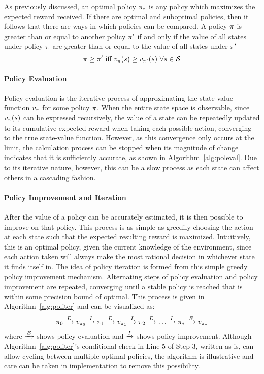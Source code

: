 As previously discussed,
an optimal policy $\pi_*$ is any policy which maximizes the expected reward
received.
%
If there are optimal and suboptimal policies,
then it follows that there are ways in which policies can be compared.
%
A policy $\pi$ is greater than or equal to another policy $\pi'$
if and only if the value of all states under policy $\pi$
are greater than or equal to the value of all states under $\pi'$
\[
\policy \ge \policy'\ 
	\text{iff}\ 
	v_\policy(s) \ge v_{\policy'}(s)\ \forall s\in\States
\]


\paragraph*{Policy Evaluation}


Policy evaluation is the iterative process of approximating the state-value
function $v_\pi$ for some policy $\pi$.
%
When the entire state space is observable,
since $v_\pi(s)$ can be expressed recursively,
the value of a state can be repeatedly updated
to its cumulative expected reward when taking each possible action,
converging to the true state-value function.
%
However,
as this convergence only occurs at the limit,
the calculation process can be stopped when its magnitude of change
indicates that it is sufficiently accurate,
as shown in Algorithm~\ref{alg:poleval}.
%
Due to its iterative nature,
however,
this can be a slow process
as each state can affect others in a cascading fashion.



\paragraph*{Policy Improvement and Iteration}



After the value of a policy can be accurately estimated,
it is then possible to improve on that policy.
% 
This process is as simple as greedily choosing the action at each state such
that the expected resulting reward is maximized.
%
Intuitively,
this is an optimal policy,
given the current knowledge of the environment,
since each action taken will always make the most rational decision
in whichever state it finds itself in.
%
The idea of policy iteration is formed
from this simple greedy policy improvement mechanism.
%
Alternating steps of policy evaluation and policy improvement are repeated,
converging
until a stable policy is reached that is within some precision bound of optimal.
%
This process is given in Algorithm~\ref{alg:politer}
and can be visualized as:
\[
	\pi_0 \xrightarrow{E} v_{\pi_0} \xrightarrow{I}
	\pi_1 \xrightarrow{E} v_{\pi_1} \xrightarrow{I}
	\pi_2 \xrightarrow{E} \ldots \xrightarrow{I}
	\pi_* \xrightarrow{E} v_{\pi_*}
\]
where $\xrightarrow{E}$ shows policy evaluation and $\xrightarrow{I}$ shows policy improvement.
%
Although Algorithm~\ref{alg:politer}'s conditional check
in Line 5 of Step 3,
written as is,
can allow cycling between multiple optimal policies,
the algorithm is illustrative
and care can be taken in implementation to remove this possibility.

